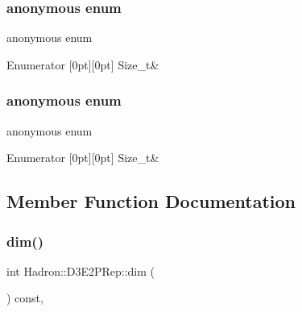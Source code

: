 \subsubsection{\texorpdfstring{anonymous enum}{anonymous enum}}
{\footnotesize\ttfamily anonymous enum}

\begin{DoxyEnumFields}{Enumerator}
[0pt][0pt]{}\mbox{\label{structHadron_1_1D3E2PRep_a45e8727b7fccfc028c1936720a9f001ca29f4e24303967a7e505e538b192362cf}} 
Size\+\_\+t&\\
\hline

\end{DoxyEnumFields}
\mbox{\label{structHadron_1_1D3E2PRep_a45e8727b7fccfc028c1936720a9f001c}} 
\subsubsection{\texorpdfstring{anonymous enum}{anonymous enum}}
{\footnotesize\ttfamily anonymous enum}

\begin{DoxyEnumFields}{Enumerator}
[0pt][0pt]{}\mbox{\label{structHadron_1_1D3E2PRep_a45e8727b7fccfc028c1936720a9f001ca29f4e24303967a7e505e538b192362cf}} 
Size\+\_\+t&\\
\hline

\end{DoxyEnumFields}


\subsection{Member Function Documentation}
\mbox{\label{structHadron_1_1D3E2PRep_a8447155b89a2ca82aa11d902df9c3eb7}} 
\subsubsection{\texorpdfstring{dim()}{dim()}\hspace{0.1cm}{\footnotesize\ttfamily [1/2]}}
{\footnotesize\ttfamily int Hadron\+::\+D3\+E2\+P\+Rep\+::dim (\begin{DoxyParamCaption}{ }\end{DoxyParamCaption}) const\hspace{0.3cm}{\ttfamily [inline]}, {\ttfamily [virtual]}}

